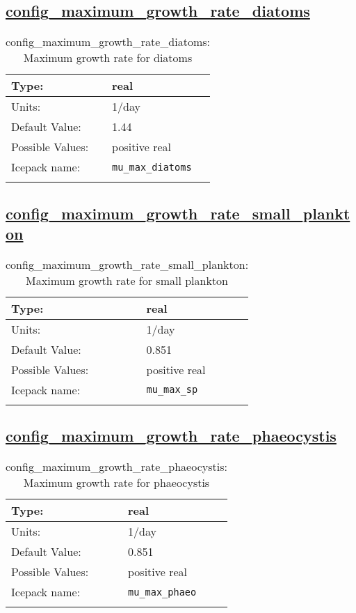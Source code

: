 \subsection[config\_maximum\_growth\_rate\_diatoms]{\hyperref[sec:nm_tab_biogeochemistry]{config\_maximum\_growth\_rate\_diatoms}}
\label{subsec:nm_sec_config_maximum_growth_rate_diatoms}
\begin{center}
\begin{longtable}{| p{2.0in} || p{4.0in} |}
    \hline
    Type: & real \\
    \hline
    Units: & \si{1/day} \\
    \hline
    Default Value: & 1.44 \\
    \hline
    Possible Values: & positive real \\
    \hline
    \hline
    Icepack name: & \verb+mu_max_diatoms+ \\
    \caption{config\_maximum\_growth\_rate\_diatoms: Maximum growth rate for diatoms}
\end{longtable}
\end{center}
\subsection[config\_maximum\_growth\_rate\_small\_plankton]{\hyperref[sec:nm_tab_biogeochemistry]{config\_maximum\_growth\_rate\_small\_plankton}}
\label{subsec:nm_sec_config_maximum_growth_rate_small_plankton}
\begin{center}
\begin{longtable}{| p{2.0in} || p{4.0in} |}
    \hline
    Type: & real \\
    \hline
    Units: & \si{1/day} \\
    \hline
    Default Value: & 0.851 \\
    \hline
    Possible Values: & positive real \\
    \hline
    \hline
    Icepack name: & \verb+mu_max_sp+ \\
    \caption{config\_maximum\_growth\_rate\_small\_plankton: Maximum growth rate for small plankton}
\end{longtable}
\end{center}
\subsection[config\_maximum\_growth\_rate\_phaeocystis]{\hyperref[sec:nm_tab_biogeochemistry]{config\_maximum\_growth\_rate\_phaeocystis}}
\label{subsec:nm_sec_config_maximum_growth_rate_phaeocystis}
\begin{center}
\begin{longtable}{| p{2.0in} || p{4.0in} |}
    \hline
    Type: & real \\
    \hline
    Units: & \si{1/day} \\
    \hline
    Default Value: & 0.851 \\
    \hline
    Possible Values: & positive real \\
    \hline
    \hline
    Icepack name: & \verb+mu_max_phaeo+ \\
    \caption{config\_maximum\_growth\_rate\_phaeocystis: Maximum growth rate for phaeocystis}
\end{longtable}
\end{center}
